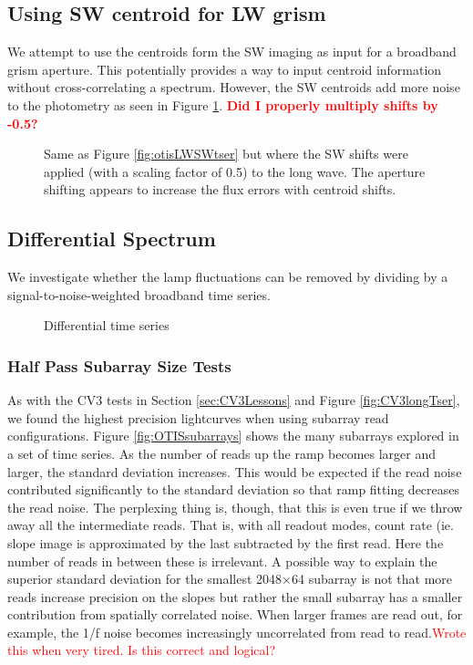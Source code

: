 \documentclass{aastex62}
\begin{document}
\clearpage
\subsection{Using SW centroid for LW grism}

We attempt to use the centroids form the SW imaging as input for a broadband grism aperture.
This potentially provides a way to input centroid information without cross-correlating a spectrum.
However, the SW centroids add more noise to the photometry as seen in Figure \ref{fig:otisLWSWtserShift}.
\textcolor{red}{\bf Did I properly multiply shifts by -0.5?}

\begin{figure}
\caption{Same as Figure \ref{fig:otisLWSWtser} but where the SW shifts were applied (with a scaling factor of 0.5) to the long wave.
The aperture shifting appears to increase the flux errors with centroid shifts.
}\label{fig:otisLWSWtserShift}
\end{figure}


\subsection{Differential Spectrum}
We investigate whether the lamp fluctuations can be removed by dividing by a signal-to-noise-weighted broadband time series.
\begin{figure}
\caption{Differential time series
}\label{fig:otisLWDiffdynSpec}
\end{figure}

\clearpage

\subsubsection{Half Pass Subarray Size Tests}

As with the CV3 tests in Section \ref{sec:CV3Lessons} and Figure \ref{fig:CV3longTser}, we found the highest precision lightcurves when using subarray read configurations.
Figure \ref{fig:OTISsubarrays} shows the many subarrays explored in a set of time series.
As the number of reads up the ramp becomes larger and larger, the standard deviation increases.
This would be expected if the read noise contributed significantly to the standard deviation so that ramp fitting decreases the read noise.
The perplexing thing is, though, that this is even true if we throw away all the intermediate reads.
That is, with all readout modes, count rate (ie. slope image is approximated by the last subtracted by the first read.
Here the number of reads in between these is irrelevant.
A possible way to explain the superior standard deviation for the smallest 2048$\times$64 subarray is not that more reads increase precision on the slopes but rather the small subarray has a smaller contribution from spatially correlated noise.
When larger frames are read out, for example, the 1/f noise becomes increasingly uncorrelated from read to read.\textcolor{red}{Wrote this when very tired. Is this correct and logical?}
\end{document}
